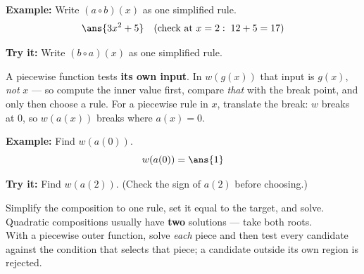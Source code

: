 \documentclass[12pt]{article}
\begin{document}
\begin{examplebox}
\textbf{Example:} Write $(a \circ b)(x)$ as one simplified rule.
\[ \ans{3x^2 + 5} \quad\text{(check at } x=2:\; 12+5=17 \text{)} \]
\end{examplebox}

\begin{tryitbox}
\textbf{Try it:} Write $(b \circ a)(x)$ as one simplified rule.\\[2pt]
\end{tryitbox}


\begin{formulabox}
A piecewise function tests \textbf{its own input}. In $w(g(x))$ that input is
$g(x)$, \emph{not} $x$ --- so compute the inner value first, compare \emph{that}
with the break point, and only then choose a rule. For a piecewise rule in $x$,
translate the break: $w$ breaks at $0$, so $w(a(x))$ breaks where $a(x) = 0$.
\end{formulabox}

\begin{examplebox}
\textbf{Example:} Find $w(a(0))$.
\[ w(a(0)) = \ans{1} \]
\end{examplebox}

\begin{tryitbox}
\textbf{Try it:} Find $w(a(2))$. (Check the sign of $a(2)$ before choosing.)
\\[2pt]
\end{tryitbox}


\begin{formulabox}
Simplify the composition to one rule, set it equal to the target, and solve.
Quadratic compositions usually have \textbf{two} solutions --- take both roots.
\\[2pt]
With a piecewise outer function, solve \emph{each} piece and then test every
candidate against the condition that selects that piece; a candidate outside its
own region is rejected.
\end{formulabox}
\end{document}
